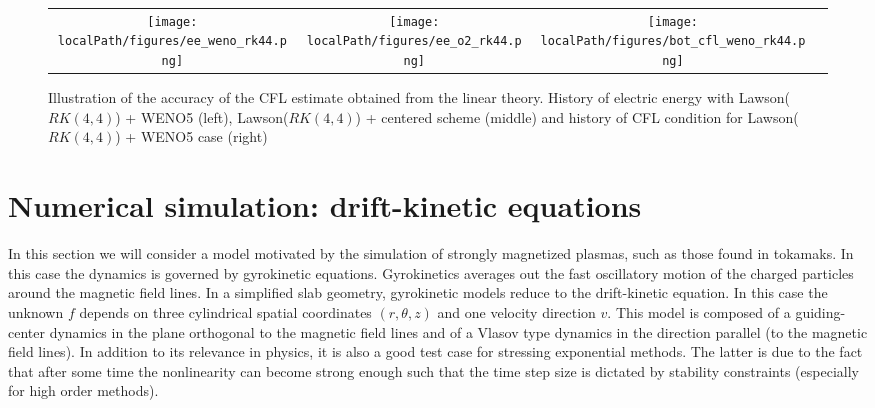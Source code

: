 \begin{figure}
  \centering
  \begin{tabular}{cccc}
    \texttt{[image: \\localPath/figures/ee\_weno\_rk44.png]} &\hspace{-0.2cm}\texttt{[image: \\localPath/figures/ee\_o2\_rk44.png]} & \hspace{-0.2cm}\texttt{[image: \\localPath/figures/bot\_cfl\_weno\_rk44.png]} 
  \end{tabular}
  \caption{Illustration of the accuracy of the CFL estimate obtained from the linear theory. History of electric energy with Lawson($RK(4,4)$) + WENO5 (left),  Lawson($RK(4,4)$) + centered scheme (middle) and history of CFL condition for Lawson($RK(4,4)$) + WENO5 case (right)}
  \label{unstable}      
\end{figure}
 

\section{Numerical simulation: drift-kinetic equations\label{sec:dk}}

In this section we will consider a model motivated by the simulation of strongly magnetized plasmas, such as those found in tokamaks. In this case the dynamics is governed by gyrokinetic equations. Gyrokinetics averages out the fast oscillatory motion of the charged particles around the magnetic field lines. In a simplified slab geometry, gyrokinetic models reduce to the drift-kinetic equation. In this case the unknown $f$ depends on three cylindrical spatial coordinates $(r,\theta,z)$ and one velocity direction $v$. This model is composed of a guiding-center dynamics in the plane orthogonal to the magnetic field lines and of a Vlasov type dynamics in the direction parallel (to the magnetic field lines). In addition to its relevance in physics, it is also a good test case for stressing exponential methods. The latter is due to the fact that after some time the nonlinearity can become strong enough such that the time step size is dictated by stability constraints (especially for high order methods).

